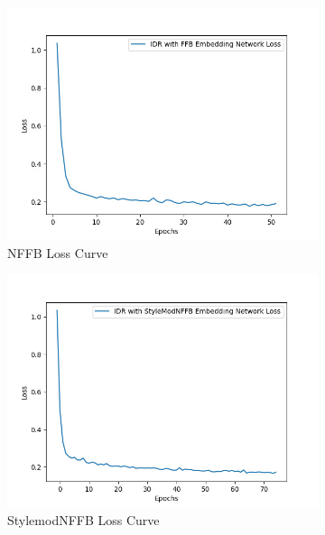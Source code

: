 \begin{figure}[H]
      \begin{subfigure}{0.3\textwidth}
        \includegraphics[width=\linewidth]{images/chapter5_img/LossPlots/Total_Loss_First_50-100_Epochs/loss_plot_FFB.jpg}
        \caption*{NFFB Loss Curve}
      \end{subfigure}
      \begin{subfigure}{0.3\textwidth}
        \includegraphics[width=\linewidth]{images/chapter5_img/LossPlots/Total_Loss_First_50-100_Epochs/loss_plot_StyleModNFFB_EpochStamp75.jpg}
        \caption*{StylemodNFFB Loss Curve}
      \end{subfigure}
      \begin{subfigure}{0.3\textwidth}

\end{subfigure}
\end{figure}

